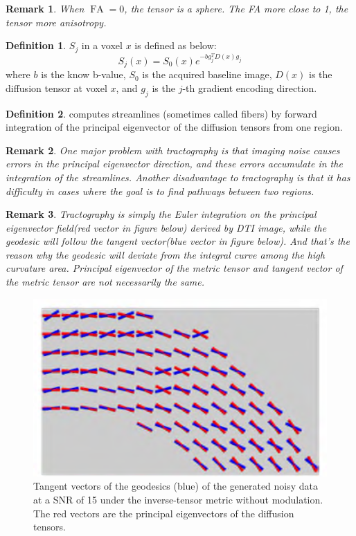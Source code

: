 \documentclass[a4paper]{article}
\theoremstyle{definition}
\newtheorem{definition}{Definition}
\theoremstyle{plain}
\newtheorem{remark}{Remark}
\begin{document}
\begin{remark}
When $\operatorname{FA}=0$, the tensor is a sphere. The FA more close to 1, the tensor more anisotropy.
\end{remark}

\begin{definition}
 $S_j$ in a voxel $x$ is defined as below:
\begin{equation*}
    S_j(x)=S_0(x)e^{-bg^T_jD(x)g_j}
\end{equation*}
where $b$ is the know b-value, $S_0$ is the acquired baseline image, $D(x)$ is the diffusion tensor at voxel $x$, and $g_j$ is the $j$-th gradient encoding direction.
\end{definition}

\begin{definition}
 computes streamlines (sometimes called fibers) by forward integration of the principal eigenvector of the diffusion tensors from one region.
\end{definition}

\begin{remark}
One major problem with tractography is that imaging noise causes errors in the principal eigenvector direction, and these errors accumulate in the integration of the streamlines. Another disadvantage to tractography is that it has difficulty in cases where the goal is to find pathways between two regions.
\end{remark}

\begin{remark}
Tractography is simply the Euler integration on the principal eigenvector field(red vector in figure below) derived by DTI image, while the geodesic will follow the tangent vector(blue vector in figure below). And that's the reason why the geodesic will deviate from the integral curve among the high curvature area. Principal eigenvector of the metric tensor and tangent vector of the metric tensor are not necessarily the same.
\end{remark}

\begin{figure}[H]
    \centering
    \includegraphics[scale=0.5]{figure/teneigen.png}
    \caption{Tangent vectors of the geodesics (blue) of the generated noisy data at a SNR of 15 under the inverse-tensor metric without modulation. The red vectors are the principal eigenvectors of the diffusion tensors.}
\end{figure}
\end{document}

